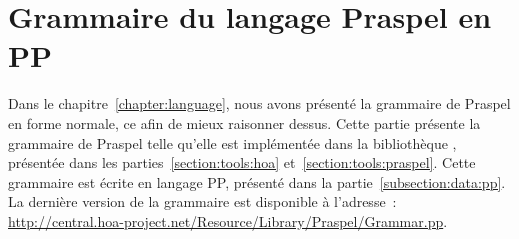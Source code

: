 \section{Grammaire du langage Praspel en PP}
\label{appendices:grammar_of_praspel}

Dans le chapitre~\ref{chapter:language}, nous avons présenté la grammaire de
Praspel en forme normale, ce afin de mieux raisonner dessus. Cette partie
présente la grammaire de Praspel telle qu'elle est implémentée dans la
bibliothèque , présentée dans les
parties~\ref{section:tools:hoa} et~\ref{section:tools:praspel}. Cette grammaire
est écrite en langage PP, présenté dans la partie~\ref{subsection:data:pp}. La
dernière version de la grammaire est disponible à l'adresse~:
\url{http://central.hoa-project.net/Resource/Library/Praspel/Grammar.pp}.

